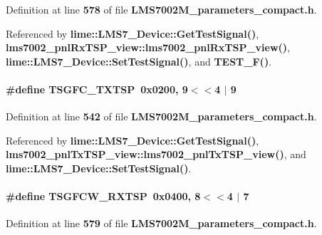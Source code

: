 Definition at line {\bf 578} of file {\bf L\+M\+S7002\+M\+\_\+parameters\+\_\+compact.\+h}.



Referenced by {\bf lime\+::\+L\+M\+S7\+\_\+\+Device\+::\+Get\+Test\+Signal()}, {\bf lms7002\+\_\+pnl\+Rx\+T\+S\+P\+\_\+view\+::lms7002\+\_\+pnl\+Rx\+T\+S\+P\+\_\+view()}, {\bf lime\+::\+L\+M\+S7\+\_\+\+Device\+::\+Set\+Test\+Signal()}, and {\bf T\+E\+S\+T\+\_\+\+F()}.

\paragraph[{T\+S\+G\+F\+C\+\_\+\+T\+X\+T\+SP}]{\setlength{\rightskip}{0pt plus 5cm}\#define T\+S\+G\+F\+C\+\_\+\+T\+X\+T\+SP~0x0200, 9$<$$<$4 $\vert$  9}\label{LMS7002M__parameters__compact_8h_affb18d948374418347080a3df4b03c00}


Definition at line {\bf 542} of file {\bf L\+M\+S7002\+M\+\_\+parameters\+\_\+compact.\+h}.



Referenced by {\bf lime\+::\+L\+M\+S7\+\_\+\+Device\+::\+Get\+Test\+Signal()}, {\bf lms7002\+\_\+pnl\+Tx\+T\+S\+P\+\_\+view\+::lms7002\+\_\+pnl\+Tx\+T\+S\+P\+\_\+view()}, and {\bf lime\+::\+L\+M\+S7\+\_\+\+Device\+::\+Set\+Test\+Signal()}.

\paragraph[{T\+S\+G\+F\+C\+W\+\_\+\+R\+X\+T\+SP}]{\setlength{\rightskip}{0pt plus 5cm}\#define T\+S\+G\+F\+C\+W\+\_\+\+R\+X\+T\+SP~0x0400, 8$<$$<$4 $\vert$  7}\label{LMS7002M__parameters__compact_8h_ab7a365a6b5946b9cb9946ce574b2b163}


Definition at line {\bf 579} of file {\bf L\+M\+S7002\+M\+\_\+parameters\+\_\+compact.\+h}.



